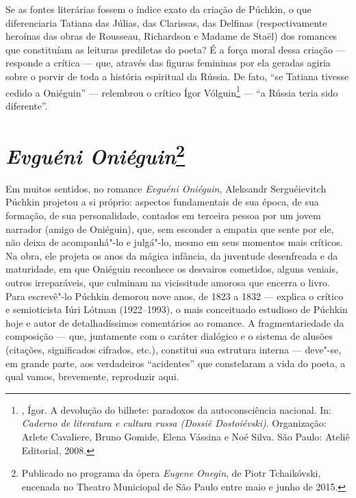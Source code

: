Se as fontes literárias fossem o índice exato da criação de Púchkin, o
que diferenciaria Tatiana das Júlias, das Clarissas, das Delfinas
(respectivamente heroínas das obras de Rousseau, Richardson e Madame de
Staël) dos romances que constituíam as leituras prediletas do poeta? É a força
moral dessa criação --- responde a crítica --- que, através das figuras
femininas por ela geradas agiria sobre o porvir de toda a história
espiritual da Rússia. De fato, ``se Tatiana tivesse cedido a Oniéguin'' ---
relembrou o crítico Ígor Vólguin\footnote{, Ígor. A devolução do bilhete: paradoxos da
autoconsciência nacional. In: \emph{Caderno de literatura e cultura russa (Dossiê Dostoiévski)}. Organização: Arlete Cavaliere, Bruno Gomide, Elena Vássina e Noé Silva. São Paulo: Ateliê Editorial, 2008.} --- ``a Rússia teria sido diferente''.

\chapter{\emph{Evguéni Oniéguin}\footnote{Publicado no programa da ópera \emph{Eugene Onegin}, de Piotr Tchaikóvski, encenada no Theatro Municiopal de São Paulo entre maio e junho de 2015.}}

Em muitos sentidos, no romance \emph{Evguéni Oniéguin},
Aleksandr Serguéievitch Púchkin
projetou a si próprio: aspectos fundamentais de sua época, de sua
formação, de sua personalidade, contados em terceira pessoa por um jovem
narrador (amigo de Oniéguin), que, sem esconder a empatia que sente por
ele, não deixa de acompanhá"-lo e julgá"-lo, mesmo em seus momentos mais
críticos. Na obra, ele projeta os anos da mágica infância, da juventude
desenfreada e da maturidade, em que Oniéguin reconhece os desvairos
cometidos, alguns veniais, outros irreparáveis, que culminam na
vicissitude amorosa que encerra o livro. Para escrevê"-lo Púchkin demorou
nove anos, de 1823 a 1832 --- explica o crítico e semioticista Iúri
Lótman (1922--1993), o mais conceituado estudioso de
Púchkin hoje e autor de detalhadíssimos comentários ao romance. A
fragmentariedade da composição --- que, juntamente com o caráter dialógico e
o sistema de alusões (citações, significados cifrados, etc.), constitui
sua estrutura interna --- deve"-se, em grande parte, aos verdadeiros
``acidentes'' que constelaram a vida do poeta, a qual vamos, brevemente,
reproduzir aqui.

